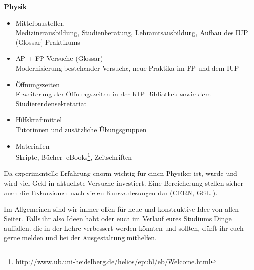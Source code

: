 \vspace{5mm}
\textbf{Physik}
\begin{itemize}
\item {Mittelbaustellen}\\
	Medizinerausbildung, Studienberatung, Lehramtsausbildung, Aufbau des IUP (Glossar) Praktikums
\item {AP + FP Versuche (Glossar)}\\
	Modernisierung bestehender Versuche, neue Praktika im FP und dem IUP
\item {Öffnungszeiten}\\
	Erweiterung der Öffnungszeiten in der \gls{KIP}-Bibliothek sowie dem Studierendensekretariat
\item {Hilfskraftmittel}\\
	Tutorinnen und zusätzliche Übungsgruppen
\item {Materialien}\\
	Skripte, Bücher, eBooks\footnote{\url{http://www.ub.uni-heidelberg.de/helios/epubl/eb/Welcome.html}}, Zeitschriften
\end{itemize}

Da experimentelle Erfahrung enorm wichtig für einen Physiker ist, wurde und wird viel Geld in aktuellste Versuche investiert. Eine Bereicherung stellen sicher auch die Exkursionen nach vielen Kursvorlesungen dar (CERN, GSI\dots).

Im Allgemeinen sind wir immer offen für neue und konstruktive Idee von allen Seiten. Falls ihr also Ideen habt oder euch im Verlauf eures Studiums Dinge auffallen, die in der Lehre verbessert werden könnten und sollten, dürft ihr euch gerne melden und bei der Ausgestaltung mithelfen.
